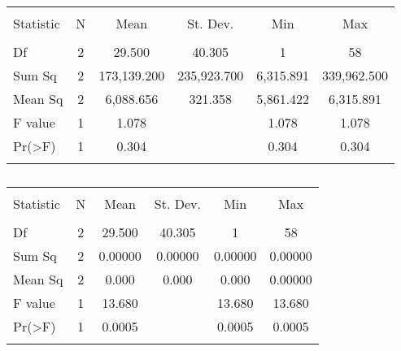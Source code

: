 \begin{table}[!htbp] \centering 
  \caption{} 
  \label{} 
\begin{tabular}{@{\extracolsep{5pt}}lccccc} 
\\[-1.8ex]\hline 
\hline \\[-1.8ex] 
Statistic & \multicolumn{1}{c}{N} & \multicolumn{1}{c}{Mean} & \multicolumn{1}{c}{St. Dev.} & \multicolumn{1}{c}{Min} & \multicolumn{1}{c}{Max} \\ 
\hline \\[-1.8ex] 
Df & 2 & 29.500 & 40.305 & 1 & 58 \\ 
Sum Sq & 2 & 173,139.200 & 235,923.700 & 6,315.891 & 339,962.500 \\ 
Mean Sq & 2 & 6,088.656 & 321.358 & 5,861.422 & 6,315.891 \\ 
F value & 1 & 1.078 &  & 1.078 & 1.078 \\ 
Pr(\textgreater F) & 1 & 0.304 &  & 0.304 & 0.304 \\ 
\hline \\[-1.8ex] 
\end{tabular} 
\end{table} 

\begin{table}[!htbp] \centering 
  \caption{} 
  \label{} 
\begin{tabular}{@{\extracolsep{5pt}}lccccc} 
\\[-1.8ex]\hline 
\hline \\[-1.8ex] 
Statistic & \multicolumn{1}{c}{N} & \multicolumn{1}{c}{Mean} & \multicolumn{1}{c}{St. Dev.} & \multicolumn{1}{c}{Min} & \multicolumn{1}{c}{Max} \\ 
\hline \\[-1.8ex] 
Df & 2 & 29.500 & 40.305 & 1 & 58 \\ 
Sum Sq & 2 & 0.00000 & 0.00000 & 0.00000 & 0.00000 \\ 
Mean Sq & 2 & 0.000 & 0.000 & 0.000 & 0.00000 \\ 
F value & 1 & 13.680 &  & 13.680 & 13.680 \\ 
Pr(\textgreater F) & 1 & 0.0005 &  & 0.0005 & 0.0005 \\ 
\hline \\[-1.8ex] 
\end{tabular} 
\end{table} 

